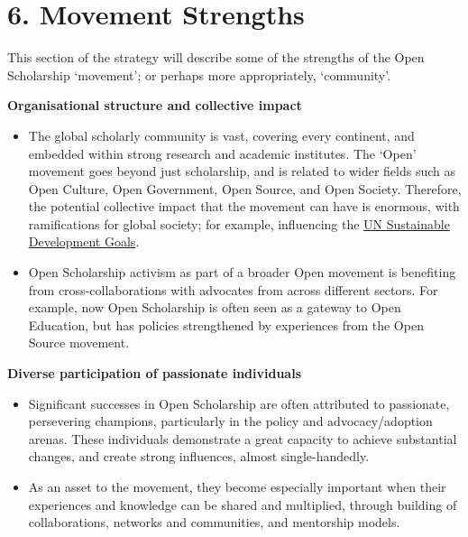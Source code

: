 \section{6. Movement Strengths }\label{movement-strengths}

This section of the strategy will describe some of the strengths of the
Open Scholarship `movement'; or perhaps more appropriately, `community'.

\textbf{Organisational structure and collective impact}

\begin{itemize}
\tightlist
\item
  The global scholarly community is vast, covering every continent, and
  embedded within strong research and academic institutes. The `Open'
  movement goes beyond just scholarship, and is related to wider fields
  such as Open Culture, Open Government, Open Source, and Open Society.
  Therefore, the potential collective impact that the movement can have
  is enormous, with ramifications for global society; for example,
  influencing the
  \href{http://www.unfoundation.org/features/globalgoals/the-global-goals.html}{UN
  Sustainable Development Goals}.
\end{itemize}

\begin{itemize}
\tightlist
\item
  Open Scholarship activism as part of a broader Open movement is
  benefiting from cross-collaborations with advocates from across
  different sectors. For example, now Open Scholarship is often seen as
  a gateway to Open Education, but has policies strengthened by
  experiences from the Open Source movement.
\end{itemize}

\textbf{Diverse participation of passionate individuals}

\begin{itemize}
\item
  Significant successes in Open Scholarship are often attributed to
  passionate, persevering champions, particularly in the policy and
  advocacy/adoption arenas. These individuals demonstrate a great
  capacity to achieve substantial changes, and create strong influences,
  almost single-handedly.
\item
  As an asset to the movement, they become especially important when
  their experiences and knowledge can be shared and multiplied, through
  building of collaborations, networks and communities, and mentorship
  models.
\end{itemize}


